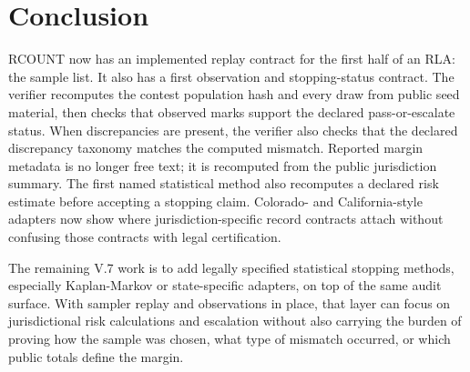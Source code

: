 \section{Conclusion}

RCOUNT now has an implemented replay contract for the first half of an RLA:
the sample list. It also has a first observation and stopping-status contract.
The verifier recomputes the contest population hash and every draw from public
seed material, then checks that observed marks support the declared
pass-or-escalate status. When discrepancies are present, the verifier also
checks that the declared discrepancy taxonomy matches the computed mismatch.
Reported margin metadata is no longer free text; it is recomputed from the
public jurisdiction summary. The first named statistical method also recomputes
a declared risk estimate before accepting a stopping claim. Colorado- and
California-style adapters now show where jurisdiction-specific record contracts
attach without confusing those contracts with legal certification.

The remaining V.7 work is to add legally specified statistical stopping
methods, especially Kaplan-Markov or state-specific adapters, on top of the
same audit surface. With sampler replay and observations in place, that layer
can focus on jurisdictional risk calculations and escalation without also
carrying the burden of proving how the sample was chosen, what type of mismatch
occurred, or which public totals define the margin.
